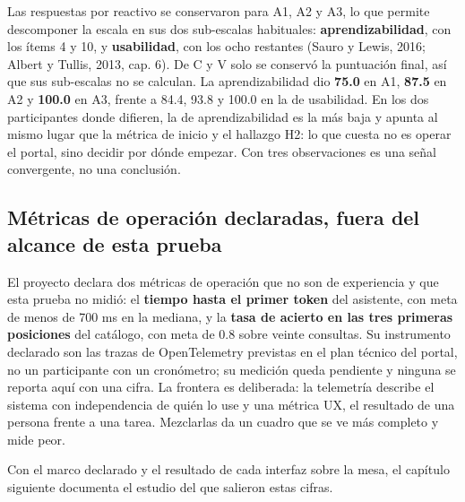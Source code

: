Las respuestas por reactivo se conservaron para A1, A2 y A3, lo que permite descomponer la escala
en sus dos sub-escalas habituales: \textbf{aprendizabilidad}, con los ítems 4 y 10, y
\textbf{usabilidad}, con los ocho restantes (Sauro y Lewis, 2016; Albert y Tullis, 2013, cap. 6).
De C y V solo se conservó la puntuación final, así que sus sub-escalas no se calculan. La
aprendizabilidad dio \textbf{75.0} en A1, \textbf{87.5} en A2 y \textbf{100.0} en A3, frente a
84.4, 93.8 y 100.0 en la de usabilidad. En los dos participantes donde difieren, la de
aprendizabilidad es la más baja y apunta al mismo lugar que la métrica de inicio y el hallazgo H2:
lo que cuesta no es operar el portal, sino decidir por dónde empezar. Con tres observaciones es
una señal convergente, no una conclusión.

\subsection{Métricas de operación declaradas, fuera del alcance de esta prueba}

\begin{uxnota}
El proyecto declara dos métricas de operación que no son de experiencia y que esta prueba no
midió: el \textbf{tiempo hasta el primer token} del asistente, con meta de menos de 700 ms en la
mediana, y la \textbf{tasa de acierto en las tres primeras posiciones} del catálogo, con meta de
0.8 sobre veinte consultas. Su instrumento declarado son las trazas de OpenTelemetry previstas en
el plan técnico del portal, no un participante con un cronómetro; su medición queda pendiente y
ninguna se reporta aquí con una cifra. La frontera es deliberada: la telemetría describe el
sistema con independencia de quién lo use y una métrica UX, el resultado de una persona frente a
una tarea. Mezclarlas da un cuadro que se ve más completo y mide peor.
\end{uxnota}

Con el marco declarado y el resultado de cada interfaz sobre la mesa, el capítulo siguiente
documenta el estudio del que salieron estas cifras.
